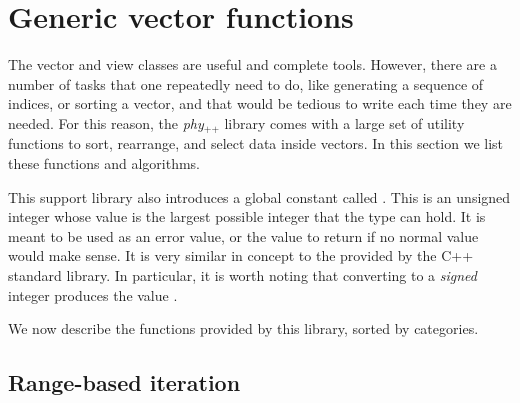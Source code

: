 \documentclass[12pt]{report}
\newcommand{\phypp}{\textit{phy}$_{\text{++}}$\xspace}
\begin{document}
\section{Generic vector functions \label{SEC:support:generic}}

The vector and view classes are useful and complete tools. However, there are a number of tasks that one repeatedly need to do, like generating a sequence of indices, or sorting a vector, and that would be tedious to write each time they are needed. For this reason, the \phypp library comes with a large set of utility functions to sort, rearrange, and select data inside vectors. In this section we list these functions and algorithms.

This support library also introduces a global constant called . This is an unsigned integer whose value is the largest possible integer that the  type can hold. It is meant to be used as an error value, or the value to return if no normal value would make sense. It is very similar in concept to the  provided by the C++ standard library. In particular, it is worth noting that converting  to a \emph{signed} integer produces the value .

We now describe the functions provided by this library, sorted by categories.

\subsection{Range-based iteration}
\end{document}
